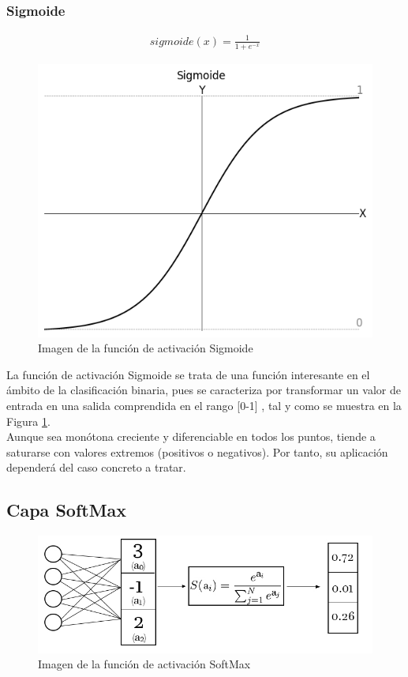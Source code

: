 \subsubsection{Sigmoide}

\begin{gather}
	sigmoide(x) = \frac{1}{1+e^{-x}}
\end{gather}

\begin{figure}[H]
	\centering
	\includegraphics[scale=0.45]{imagenes/sigmoide.jpg}  
	\caption{Imagen de la función de activación Sigmoide}
	\label{fig:Sigmoide}
\end{figure}

La función de activación Sigmoide se trata de una función interesante en el ámbito de la clasificación binaria, pues se caracteriza por transformar un valor de entrada en una salida comprendida en el rango [0-1] , tal y como se muestra en la Figura \ref{fig:Sigmoide}. \\
Aunque sea monótona creciente y diferenciable en todos los puntos, tiende a saturarse con valores extremos (positivos o negativos). Por tanto, su aplicación dependerá del caso concreto a tratar. \cite{Sigmoide}

\subsection{Capa SoftMax}

\begin{figure}[H]
	\centering
	\includegraphics[scale=0.35]{imagenes/softmax.jpg}  
	\caption{Imagen de la función de activación SoftMax}
	\label{fig:SoftMax}
\end{figure}


